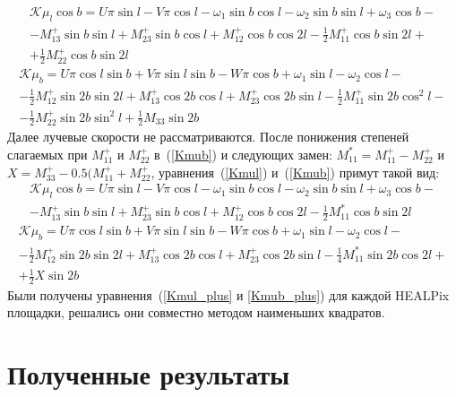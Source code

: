 \documentclass[14pt]{article} %
\begin{document}
\begin{multline}\label{Kmul}
\mathcal{K}\mu_l\cos b=U\pi\sin l-V\pi\cos l-\omega_1\sin b\cos l-\omega_2\sin b\sin l+\omega_3\cos b-\\-M_{13}^+\sin b\sin l+M_{23}^+\sin b\cos l+M_{12}^+\cos b\cos2l-\frac{1}{2}M_{11}^+\cos b\sin2l+\\+\frac{1}{2}M_{22}^+\cos b\sin2l
\end{multline}
\begin{multline}\label{Kmub}
\mathcal{K}\mu_b=U\pi\cos l\sin b+V\pi\sin l\sin b-W\pi\cos b+\omega_1\sin l-\omega_2\cos l-\\-\frac{1}{2}M_{12}^+\sin2b\sin2l+M_{13}^+\cos2b\cos l+M_{23}^+\cos2b\sin l-\frac{1}{2}M_{11}^+\sin2b\cos^2l-\\-\frac{1}{2}M_{22}^+\sin2b\sin^2l+\frac{1}{2}M_{33}\sin2b
\end{multline}
Далее лучевые скорости не рассматриваются. После понижения степеней слагаемых при $M_{11}^+$ и $M_{22}^+$ в~(\ref{Kmub}) и следующих замен: $M_{11}^*=M_{11}^+-M_{22}^+$ и $X=M_{33}^+-0.5(M_{11}^++M_{22}^+$, уравнения~(\ref{Kmul}) и~(\ref{Kmub}) примут такой вид:
\begin{multline}\label{Kmul_plus}
\mathcal{K}\mu_l\cos b=U\pi\sin l-V\pi\cos l-\omega_1\sin b\cos l-\omega_2\sin b\sin l+\omega_3\cos b-\\-M_{13}^+\sin b\sin l+M_{23}^+\sin b\cos l+M_{12}^+\cos b\cos2l-\frac{1}{2}M_{11}^*\cos b\sin2l
\end{multline}
\begin{multline}\label{Kmub_plus}
\mathcal{K}\mu_b=U\pi\cos l\sin b+V\pi\sin l\sin b-W\pi\cos b+\omega_1\sin l-\omega_2\cos l-\\-\frac{1}{2}M_{12}^+\sin2b\sin2l+M_{13}^+\cos2b\cos l+M_{23}^+\cos2b\sin l-\frac{1}{4}M_{11}^*\sin2b\cos2l+\\+\frac{1}{2}X\sin2b
\end{multline}
Были получены уравнения~(\ref{Kmul_plus} и \ref{Kmub_plus}) для каждой HEALPix площадки, решались они совместно методом наименьших квадратов.
\section{Полученные результаты}
\end{document}
